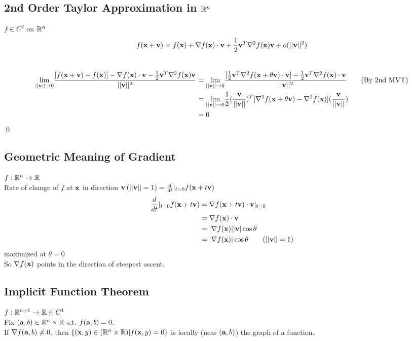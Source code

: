 \documentclass[11pt]{article}
\begin{document}
\subsection{2nd Order Taylor Approximation in $\mathbb{R}^n$}
$f \in C^2$ on $\mathbb{R}^n$ \\
$$f(\textbf{x} + \textbf{v}) = f(\textbf{x}) + \nabla f(\textbf{x}) \cdot \textbf{v} + \frac{1}{2}\textbf{v}^T\nabla^2 f(\textbf{x}) \textbf{v} + o(||\textbf{v}||^2)$$
 \\
\begin{align*}
	\underset{||\textbf{v}|| \rightarrow 0}{\lim} \frac{[f(\textbf{x} + \textbf{v}) - f(\textbf{x})] - \nabla f(\textbf{x})\cdot \textbf{v} - \frac{1}{2} \textbf{v}^T \nabla^2 f(\textbf{x})\textbf{v}}{||\textbf{v}||^2} 
	&= \underset{||\textbf{v}|| \rightarrow 0}{\lim} \frac{[\frac{1}{2}\textbf{v}^T\nabla^2 f(\textbf{x} + \theta \textbf{v}) \cdot \textbf{v}] - \frac{1}{2}\textbf{v}^T\nabla^2 f(\textbf{x}) \cdot \textbf{v}}{||\textbf{v}||^2} \tag{By 2nd MVT}\\
	&=  \underset{||\textbf{v}|| \rightarrow 0}{\lim} \frac{1}{2}(\frac{\textbf{v}}{||\textbf{v}||})^T[\nabla^2 f(\textbf{x} + \theta \textbf{v}) - \nabla^2 f(\textbf{x})](\frac{\textbf{v}}{||\textbf{v}||}) \\
	&= 0
\end{align*}
\qed 
\subsection{Geometric Meaning of Gradient}
$f: \mathbb{R}^n \rightarrow \mathbb{R}$\\
Rate of change of $f$ at $\textbf{x}$ in direction $\textbf{v} \, (||\textbf{v}||=1) = \frac{d}{dt}|_{t=0}f(\textbf{x} + t\textbf{v})$
\begin{align*}
	\frac{d}{dt}|_{t=0}f(\vx + t\vv) &= \nabla f(\vx + t\vv) \cdot \vv |_{t=0} \\
	&= \nabla f(\vx)\cdot \vv \\
	&= |\nabla f(\vx)| |\vv| \cos \theta\\
	&= |\nabla f(\vx)| \cos \theta \tag{$||\vv||  = 1$}
\end{align*}
maximized at $\theta = 0$ \\
So $\nabla f(\textbf{x})$ points in the direction of steepest ascent.

\subsection{Implicit Function Theorem}
$f: \mathbb{R}^{n+1} \rightarrow \mathbb{R} \in C^1$ \\
Fix $(\textbf{a},b) \in \mathbb{R}^n \times \mathbb{R}$ s.t. $f(\textbf{a},b) = 0$. \\
If $\nabla f(\textbf{a},b) \neq 0$, then $\{(\textbf{x}, y) \in (\mathbb{R}^n \times \mathbb{R}) | f(\textbf{x}, y) = 0\}$ is locally (near $(\textbf{a}, b)$) the graph of a function.
\end{document}
